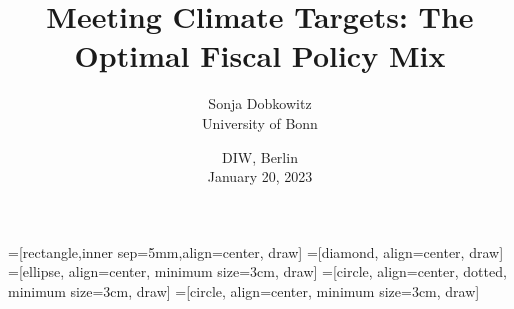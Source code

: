 \documentclass[11pt,aspectratio=169]{beamer}
\author[Sonja Dobkowitz]{\small Sonja Dobkowitz\\ \footnotesize{University of Bonn%
}\\ }
\title{Meeting Climate Targets: The Optimal Fiscal Policy Mix}
\date{\small{DIW, Berlin\\ January 20, 2023 }}
\begin{document}
=[rectangle,inner sep=5mm,align=center, draw]
=[diamond, align=center, draw]
=[ellipse, align=center,  minimum size=3cm, draw]
=[circle, align=center, dotted, minimum size=3cm, draw]
=[circle, align=center, minimum size=3cm, draw]

{
	\begin{frame}
		\titlepage
	\end{frame}
}



\end{document}
